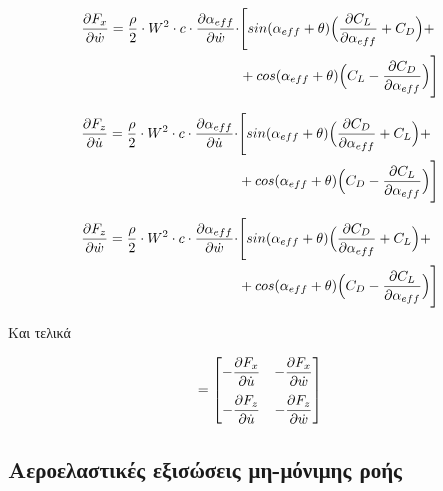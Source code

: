\begin{equation}
   \begin{aligned} 
   \dfrac{\partial F_x}{\partial \dot{w}} = \dfrac{\rho}{2}\cdot W^2 \cdot c \cdot \dfrac{\partial \alpha_{eff}}{\partial \dot{w}} \cdot & \Bigg[sin(\alpha_{eff}+\theta)\Big(\dfrac{\partial C_L}{\partial \alpha_{eff}}+C_D\Big) + \\
   &+ cos(\alpha_{eff}+\theta)\Big(C_L-\dfrac{\partial C_D}{\partial \alpha_{eff}}\Big)\Bigg]
   \end{aligned} 
    \label{eq:Fxw}
\end{equation}

\vspace{0.6cm}

\begin{equation}
   \begin{aligned} 
   \dfrac{\partial F_z}{\partial \dot{u}} = \dfrac{\rho}{2}\cdot W^2 \cdot c \cdot \dfrac{\partial \alpha_{eff}}{\partial \dot{u}} \cdot & \Bigg[sin(\alpha_{eff}+\theta)\Big(\dfrac{\partial C_D}{\partial \alpha_{eff}}+C_L\Big) + \\
   &+ cos(\alpha_{eff}+\theta)\Big(C_D-\dfrac{\partial C_L}{\partial \alpha_{eff}}\Big)\Bigg]
   \end{aligned} 
    \label{eq:Fzu}
\end{equation}

\begin{equation}
   \begin{aligned} 
   \dfrac{\partial F_z}{\partial \dot{w}} = \dfrac{\rho}{2}\cdot W^2 \cdot c \cdot \dfrac{\partial \alpha_{eff}}{\partial \dot{w}} \cdot & \Bigg[sin(\alpha_{eff}+\theta)\Big(\dfrac{\partial C_D}{\partial \alpha_{eff}}+C_L\Big) + \\
   &+ cos(\alpha_{eff}+\theta)\Big(C_D-\dfrac{\partial C_L}{\partial \alpha_{eff}}\Big)\Bigg]
   \end{aligned} 
    \label{eq:Fzw}
\end{equation}

\noindent Και τελικά

\begin{equation}
    [\mathbf{C}] = 
    \begin{bmatrix}
        -\dpart{F_x}{\dot{u}} & -\dpart{F_x}{\dot{w}}\\[10pt]
        -\dpart{F_z}{\dot{u}} & -\dpart{F_z}{\dot{w}}\\
    \end{bmatrix}
    \label{eq:steadyC}
\end{equation}

\subsection{Αεροελαστικές εξισώσεις μη-μόνιμης ροής}

